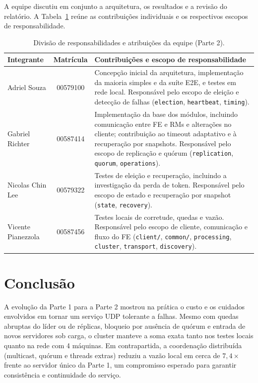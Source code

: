 \documentclass[12pt]{article}
\begin{document}
A equipe discutiu em conjunto a arquitetura, os resultados e a revisão do relatório. A Tabela~\ref{tab:equipe} reúne as contribuições individuais e os respectivos escopos de responsabilidade.

\begin{table}[H]
\centering
\caption{Divisão de responsabilidades e atribuições da equipe (Parte 2).}
\label{tab:equipe}
\small
\begin{tabularx}{\textwidth}{l c X}
\toprule
\textbf{Integrante} & \textbf{Matrícula} & \textbf{Contribuições e escopo de responsabilidade} \\
\midrule
Adriel Souza & 00579100 & Concepção inicial da arquitetura, implementação da maioria simples e da suíte E2E, e testes em rede local. Responsável pelo escopo de eleição e detecção de falhas (\texttt{election}, \texttt{heartbeat}, \texttt{timing}). \\
Gabriel Richter & 00587414 & Implementação da base dos módulos, incluindo comunicação entre FE e RMs e alterações no cliente; contribuição ao timeout adaptativo e à recuperação por snapshots. Responsável pelo escopo de replicação e quórum (\texttt{replication}, \texttt{quorum}, \texttt{operations}). \\
Nicolas Chin Lee & 00579322 & Testes de eleição e recuperação, incluindo a investigação da perda de token. Responsável pelo escopo de estado e recuperação por snapshot (\texttt{state}, \texttt{recovery}). \\
Vicente Pianezzola & 00587456 & Testes locais de corretude, quedas e vazão. Responsável pelo escopo de cliente, comunicação e fluxo do FE (\texttt{client/}, \texttt{common/}, \texttt{processing}, \texttt{cluster}, \texttt{transport}, \texttt{discovery}). \\
\bottomrule
\end{tabularx}
\end{table}

\FloatBarrier
\section{Conclusão}

A evolução da Parte 1 para a Parte 2 mostrou na prática o custo e os cuidados envolvidos em tornar um serviço UDP tolerante a falhas. Mesmo com quedas abruptas do líder ou de réplicas, bloqueio por ausência de quórum e entrada de novos servidores sob carga, o cluster manteve a soma exata tanto nos testes locais quanto na rede com 4 máquinas. Em contrapartida, a coordenação distribuída (multicast, quórum e threads extras) reduziu a vazão local em cerca de $7{,}4\times$ frente ao servidor único da Parte 1, um compromisso esperado para garantir consistência e continuidade do serviço.
\end{document}
